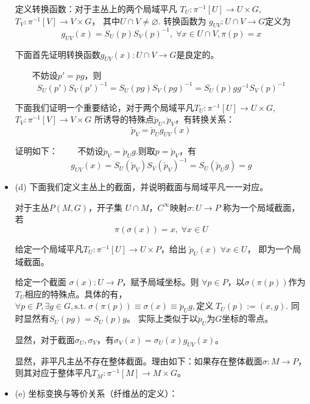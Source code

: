 \documentclass{ctexbook}
\begin{document}
\begin{itemize}
    定义转换函数：对于主丛上的两个局域平凡 $T_{U}\colon \pi^{-1}[U]\to U\times G$,
    $T_{V}\colon \pi^{-1}[V]\to V\times G$， 其中$U\cap V\neq\varnothing$. 转换函数为 $g_{UV}\colon U\cap V\to G$定义为
    \begin{equation}
        g_{UV}(x)=S_{U}(p)S_{V}(p)^{-1},\;\forall x\in U\cap V,\pi(p)=x
    \end{equation}
    
    下面首先证明转换函数$g_{UV}(x)\colon U\cap V\to G$是良定的。
    
    $\qquad$不妨设$p'=pg$，则
    \begin{equation}
        S_{U}(p')S_{V}(p')^{-1}=S_{U}(pg)S_{V}(pg)^{-1}=S_{U}(p)gg^{-1}S_{V}(p)^{-1}
    \end{equation}
    
    下面我们证明一个重要结论，对于两个局域平凡$T_{U}\colon \pi^{-1}[U]\to U\times G$,$T_{V}\colon \pi^{-1}[V]\to V\times G$ 所诱导的特殊点$\breve{p}_{U},\breve{p}_{V}$，有转换关系：
    \begin{equation}
        \breve{p}_{V}=\breve{p}_{U}g_{UV}(x)
    \end{equation}
    
    证明如下：
    $\qquad$不妨设$\breve{p}_{V}=\breve{p}_{U}g$.则取$p=\breve{p}_{V}$，有
    \begin{equation}
        g_{UV}(x)=S_{U}(\breve{p}_V)S_{V}(\breve{p}_{V})^{-1}=S_{U}(\breve{p}_Ug)=g
    \end{equation}

    \item (d) 下面我们定义主丛上的截面，并说明截面与局域平凡一一对应。
    
    对于主丛$P(M,G)$，开子集 $U\cap M$，$C^{\infty}$映射$\sigma\colon U\to P$ 称为一个局域截面，若
    \begin{equation}
        \pi(\sigma(x))=x,\;\forall x\in U
    \end{equation}
    
    给定一个局域平凡$T_{U}\colon \pi^{-1}[U]\to U\times P$，给出 $\breve{p}_{U}(x)\;\forall x\in U$， 即为一个局域截面。 
    
    给定一个截面 $\sigma(x)\colon U\to P$，赋予局域坐标。则 $\forall p\in P$，以$\sigma(\pi(p))$作为 $T_U$相应的特殊点。具体的有，$\forall p\in P,\exists g\in G,\text{s.t.}\;\sigma(\pi(p))\equiv \sigma(x)\equiv\breve{p}_U g,\text{定义}\; T_U(p):=(x,g).$ 同时显然有$S_U(pg)=S_U(p)g$。 实际上类似于以$\breve{p}_U$为$G$坐标的零点。
    
    显然，对于截面$\sigma_{U},\sigma_V$，有$\sigma_V(x)=\sigma_{U}(x)g_{UV}(x)$。
    
    显然，非平凡主丛不存在整体截面。理由如下：如果存在整体截面$\sigma\colon M\to P$，则其对应于整体平凡$T_M\colon \pi^{-1}[M]\to M\times G$。
    
    \item (e) 坐标变换与等价关系（纤维丛的定义）：
    
\end{itemize}
\end{document}
